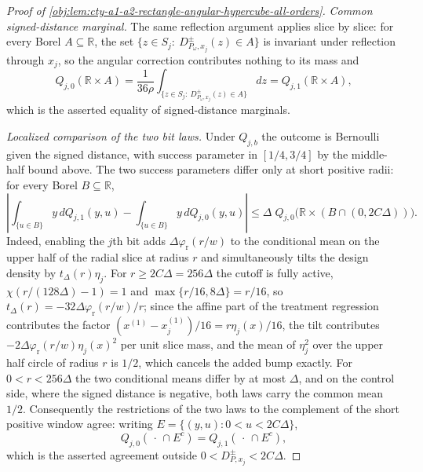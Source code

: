 \documentclass[11pt]{article}
\begin{document}
\begin{proof}[Proof of \cref{obj:lem:cty-a1-a2-rectangle-angular-hypercube-all-orders}]
\emph{Common signed-distance marginal.}
The same reflection argument applies slice by slice: for every Borel \(A\subseteq\mathbb R\), the set \(\{z\in S_j:\ D^{\pm}_{P_\omega,x_j}(z)\in A\}\) is invariant under reflection through \(x_j\), so the angular correction contributes nothing to its mass and
\[
Q_{j,0}(\mathbb R\times A)
=
\frac1{36\rho}\int_{\{z\in S_j:\ D^{\pm}_{P_\omega,x_j}(z)\in A\}}dz
=
Q_{j,1}(\mathbb R\times A),
\]
which is the asserted equality of signed-distance marginals.

\emph{Localized comparison of the two bit laws.}
Under \(Q_{j,b}\) the outcome is Bernoulli given the signed distance, with success parameter in \([1/4,3/4]\) by the middle-half bound above.  The two success parameters differ only at short positive radii: for every Borel \(B\subseteq\mathbb R\),
\[
\left|
\int_{\{u\in B\}} y\,dQ_{j,1}(y,u)
-
\int_{\{u\in B\}} y\,dQ_{j,0}(y,u)
\right|
\leq
\Delta\;Q_{j,0}\bigl(\mathbb R\times(B\cap(0,2C\Delta))\bigr).
\]
Indeed, enabling the \(j\)th bit adds \(\Delta\varphi_{\mathrm r}(r/w)\) to the conditional mean on the upper half of the radial slice at radius \(r\) and simultaneously tilts the design density by \(t_\Delta(r)\eta_j\).  For \(r\geq2C\Delta=256\Delta\) the cutoff is fully active, \(\chi(r/(128\Delta)-1)=1\) and \(\max\{r/16,8\Delta\}=r/16\), so \(t_\Delta(r)=-32\Delta\varphi_{\mathrm r}(r/w)/r\); since the affine part of the treatment regression contributes the factor \((x^{(1)}-x_j^{(1)})/16=r\eta_j(x)/16\), the tilt contributes \(-2\Delta\varphi_{\mathrm r}(r/w)\eta_j(x)^2\) per unit slice mass, and the mean of \(\eta_j^2\) over the upper half circle of radius \(r\) is \(1/2\), which cancels the added bump exactly.  For \(0<r<256\Delta\) the two conditional means differ by at most \(\Delta\), and on the control side, where the signed distance is negative, both laws carry the common mean \(1/2\).
Consequently the restrictions of the two laws to the complement of the short positive window agree: writing \(E=\{(y,u):0<u<2C\Delta\}\),
\[
Q_{j,0}(\,\cdot\,\cap E^{c})=Q_{j,1}(\,\cdot\,\cap E^{c}),
\]
which is the asserted agreement outside \(0<D^{\pm}_{P,x_j}<2C\Delta\).


\end{proof}
\end{document}
